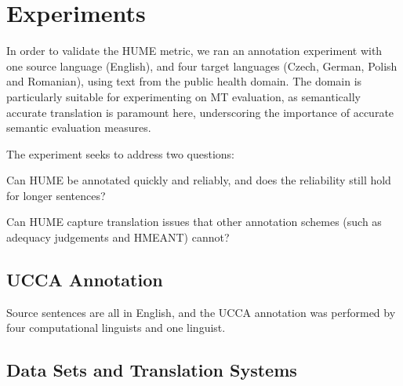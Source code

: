 \documentclass[11pt]{article}
\newcommand{\bh}[1]{}
\begin{document}




\section{Experiments}\label{sec:experiments}


In order to validate the HUME metric, we ran an annotation experiment with one source language (English),
and four target languages (Czech, German, Polish and Romanian), using text from the public health domain.
The domain is particularly suitable for experimenting on MT evaluation, as semantically
accurate translation is paramount here, underscoring the importance of accurate
semantic evaluation measures.


The experiment seeks to address two questions:

\begin{compactitem}
\item Can HUME be annotated quickly and reliably, and does the reliability still hold for longer sentences?
\item Can HUME capture translation issues that other annotation schemes (such as
adequacy judgements and HMEANT)
cannot?
\end{compactitem}

\subsection{UCCA Annotation}
Source sentences are all in English, and the UCCA annotation was performed by four
computational linguists and one linguist.

\subsection{Data Sets and Translation Systems}
\end{document}
